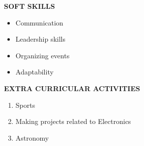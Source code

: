 \documentclass[a4paper]{article}
\begin{document}
\begin{flushleft}
\textbf {SOFT SKILLS}\\
\begin{itemize}
\item Communication
\item Leadership skills
\item Organizing events
\item Adaptability
\end{itemize}
\end{flushleft}

\begin{flushleft}
\textbf {EXTRA CURRICULAR ACTIVITIES}\\
\begin{enumerate}
\item Sports
\item Making projects related to Electronics
\item Astronomy
\end{enumerate}
\end{flushleft}
\end{document}
